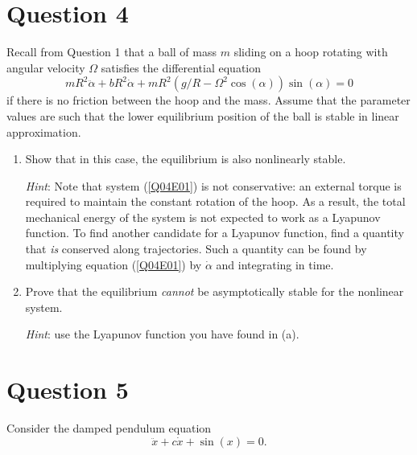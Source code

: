 \documentclass[twoside,10pt,a4paper]{article}
\begin{document}
\section*{Question 4}
Recall from Question 1 that a ball of mass $m$ sliding on a hoop rotating with angular velocity $\Omega$ satisfies the differential equation
\begin{equation}\label{Q04E01}
	mR^2 \ddot{\alpha} + bR^2 \dot{\alpha} + mR^2(g/R - \Omega^2 \cos(\alpha)) \sin(\alpha) = 0
\end{equation}
if there is no friction between the hoop and the mass. Assume that the parameter values are such that the lower equilibrium position of the ball is stable in linear approximation.

\begin{enumerate}[label=(\alph*)]
	\item Show that in this case, the equilibrium is also nonlinearly stable. 
	
	\textit{Hint}: Note that system (\ref{Q04E01}) is not conservative: an external torque is required to maintain the constant rotation of the hoop. As a result, the total mechanical energy of the system is not expected to work as a Lyapunov function. To find another candidate for a Lyapunov function, find a quantity that \textit{is} conserved along trajectories. Such a quantity can be found by multiplying equation (\ref{Q04E01}) by $\dot{\alpha}$ and integrating in time.
	\item Prove that the equilibrium \textit{cannot} be asymptotically stable for the nonlinear system.
	
	\textit{Hint}: use the Lyapunov function you have found in (a).
\end{enumerate}

\section*{Question 5}
Consider the damped pendulum equation
\begin{equation}\label{Q05E01}
	\ddot{x} + c\dot{x} + \sin(x) = 0.
\end{equation}
\end{document}

